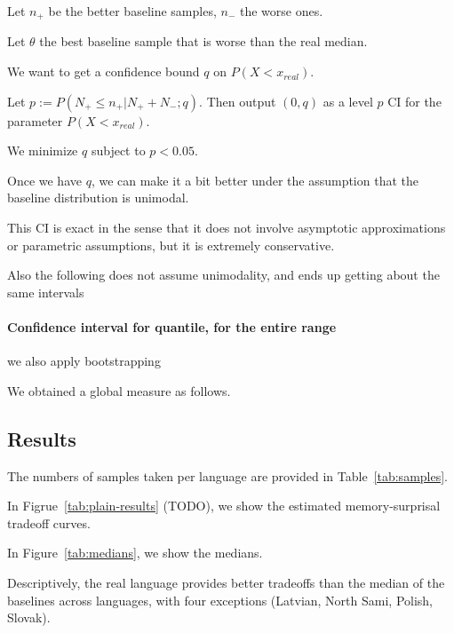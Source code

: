 \documentclass[11pt,letterpaper]{article}
\begin{document}
Let $n_+$ be the better baseline samples, $n_-$ the worse ones.

Let $\theta$ the best baseline sample that is worse than the real median.

We want to get a confidence bound $q$ on $P(X < x_{real})$.

Let $p := P(N_+ \leq n_+ | N_+ + N_-; q)$.
Then output $(0, q)$ as a level $p$ CI for the parameter $P(X < x_{real})$.

We minimize $q$ subject to $p < 0.05$.

Once we have $q$, we can make it a bit better under the assumption that the baseline distribution is unimodal.

This CI is exact in the sense that it does not involve asymptotic approximations or parametric assumptions, but it is extremely conservative.

Also the following does not assume unimodality, and ends up getting about the same intervals



\paragraph{Confidence interval for quantile, for the entire range}

we also apply bootstrapping

We obtained a global measure as follows.











\subsection{Results}

The numbers of samples taken per language are provided in Table~\ref{tab:samples}.

In Figrue~\ref{tab:plain-results} (TODO), we show the estimated memory-surprisal tradeoff curves.

In Figure~\ref{tab:medians}, we show the medians.

Descriptively, the real language provides better tradeoffs than the median of the baselines across languages, with four exceptions (Latvian, North Sami, Polish, Slovak).
\end{document}
